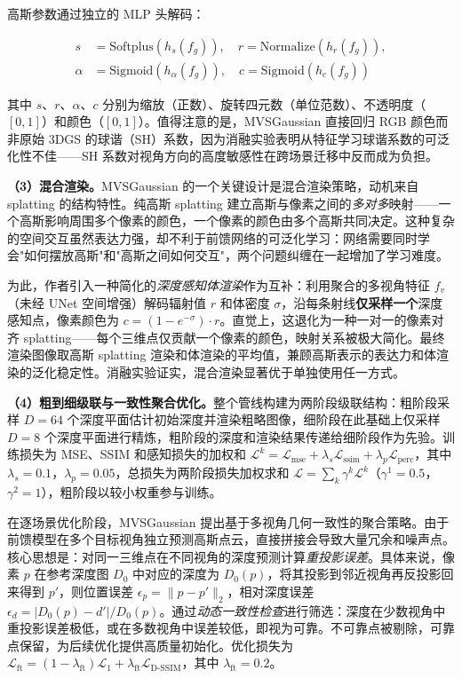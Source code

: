 高斯参数通过独立的 MLP 头解码：

\begin{align}
s &= \text{Softplus}(h_s(f_g)), \quad r = \text{Normalize}(h_r(f_g)), \\
\alpha &= \text{Sigmoid}(h_\alpha(f_g)), \quad c = \text{Sigmoid}(h_c(f_g))
\end{align}

其中 $s$、$r$、$\alpha$、$c$ 分别为缩放（正数）、旋转四元数（单位范数）、不透明度（$[0,1]$）和颜色（$[0,1]$）。值得注意的是，MVSGaussian 直接回归 RGB 颜色而非原始 3DGS 的球谐（SH）系数，因为消融实验表明从特征学习球谐系数的可泛化性不佳——SH 系数对视角方向的高度敏感性在跨场景迁移中反而成为负担。

\textbf{（3）混合渲染。}MVSGaussian 的一个关键设计是混合渲染策略，动机来自 splatting 的结构特性。纯高斯 splatting 建立高斯与像素之间的\emph{多对多}映射——一个高斯影响周围多个像素的颜色，一个像素的颜色由多个高斯共同决定。这种复杂的空间交互虽然表达力强，却不利于前馈网络的可泛化学习：网络需要同时学会"如何摆放高斯"和"高斯之间如何交互"，两个问题纠缠在一起增加了学习难度。

为此，作者引入一种简化的\emph{深度感知体渲染}作为互补：利用聚合的多视角特征 $f_v$（未经 UNet 空间增强）解码辐射值 $r$ 和体密度 $\sigma$，沿每条射线\textbf{仅采样一个}深度感知点，像素颜色为 $c = (1 - e^{-\sigma}) \cdot r$。直觉上，这退化为一种一对一的像素对齐 splatting——每个三维点仅贡献一个像素的颜色，映射关系被极大简化。最终渲染图像取高斯 splatting 渲染和体渲染的平均值，兼顾高斯表示的表达力和体渲染的泛化稳定性。消融实验证实，混合渲染显著优于单独使用任一方式。

\textbf{（4）粗到细级联与一致性聚合优化。}整个管线构建为两阶段级联结构：粗阶段采样 $D=64$ 个深度平面估计初始深度并渲染粗略图像，细阶段在此基础上仅采样 $D=8$ 个深度平面进行精炼，粗阶段的深度和渲染结果传递给细阶段作为先验。训练损失为 MSE、SSIM 和感知损失的加权和 $\mathcal{L}^k = \mathcal{L}_{\text{mse}} + \lambda_s \mathcal{L}_{\text{ssim}} + \lambda_p \mathcal{L}_{\text{perc}}$，其中 $\lambda_s = 0.1$，$\lambda_p = 0.05$，总损失为两阶段损失加权求和 $\mathcal{L} = \sum_k \gamma^k \mathcal{L}^k$（$\gamma^1 = 0.5$，$\gamma^2 = 1$），粗阶段以较小权重参与训练。

在逐场景优化阶段，MVSGaussian 提出基于多视角几何一致性的聚合策略。由于前馈模型在多个目标视角独立预测高斯点云，直接拼接会导致大量冗余和噪声点。核心思想是：对同一三维点在不同视角的深度预测计算\emph{重投影误差}。具体来说，像素 $p$ 在参考深度图 $D_0$ 中对应的深度为 $D_0(p)$，将其投影到邻近视角再反投影回来得到 $p'$，则位置误差 $\epsilon_p = \|p - p'\|_2$，相对深度误差 $\epsilon_d = |D_0(p) - d'| / D_0(p)$。通过\emph{动态一致性检查}进行筛选：深度在少数视角中重投影误差极低，或在多数视角中误差较低，即视为可靠。不可靠点被剔除，可靠点保留，为后续优化提供高质量初始化。优化损失为 $\mathcal{L}_{\text{ft}} = (1-\lambda_{\text{ft}})\mathcal{L}_1 + \lambda_{\text{ft}} \mathcal{L}_{\text{D-SSIM}}$，其中 $\lambda_{\text{ft}} = 0.2$。

